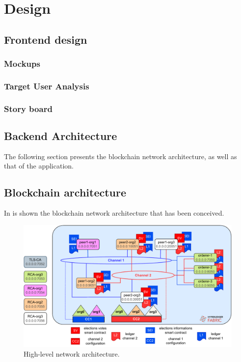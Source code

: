 \documentclass{scrartcl}
\begin{document}
\fi

\section{Design}

\subsection{Frontend design}

\subsubsection*{Mockups}

\subsubsection*{Target User Analysis}

\subsubsection*{Story board}

\subsection{Backend Architecture}


\iffalse

The following section presents the blockchain network architecture, as well as that of the application.

\subsection{Blockchain architecture}
\label{subsec:blockchain-architecture}

In  is shown the blockchain network architecture that has been conceived.

\begin{figure}
    \centering
    \includegraphics[width=\linewidth]{figures/network-architecture.pdf}
    \caption{High-level network architecture.}
    \label{fig:network-architecture}
\end{figure}
\end{document}
